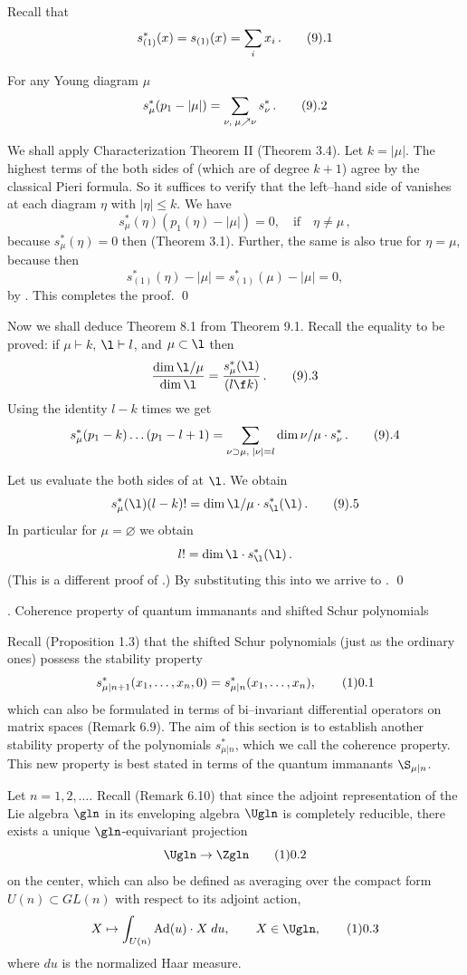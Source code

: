 Recall that 
$$
s^*_{(1)}(x)=s_{(1)}(x)=\sum_i x_i \,.\tag9.1
$$

 For any Young diagram $\mu$
$$
s^*_\mu (p_1-|\mu|) = \sum_{\nu,\;\mu\nearrow\nu} s^*_{\nu} \,. \tag9.2 
$$
\endproclaim

 We shall apply Characterization Theorem II (Theorem 3.4).
Let $k=|\mu|$. The highest terms of the both sides of  (which are 
of degree $k+1$) agree by the classical Pieri formula. So it suffices to
verify that the left--hand side of  vanishes at each diagram
$\eta$ with $|\eta|\le k$. We have
$$
s^*_\mu(\eta)(p_1(\eta)-|\mu|)=0,\quad\text{if}\quad 
\eta\ne\mu \,,
$$
because $s^*_\mu(\eta)=0$ then (Theorem 3.1). Further, the same is also
true for $\eta=\mu$, because then
$$
s^*_{(1)}(\eta)-|\mu|=s^*_{(1)}(\mu)-|\mu|=0,
$$
by . This completes the proof. \qed
\enddemo

Now we shall deduce Theorem 8.1 from Theorem 9.1. 
Recall the equality to be proved: if $\mu\vdash k$, $\l\vdash l$, and
$\mu\subset\l$ then
$$
\frac{\dim \l/\mu}{\dim \l} =
\frac{s^*_\mu(\l)}{(l\f k)} \,. \tag9.3
$$  
Using the identity  $l-k$ times we get
$$
s^*_\mu(p_1-k)\dots(p_1-l+1)=
\sum_{\nu\supset\mu,\;|\nu|=l} \dim\nu/\mu\cdot s^*_{\nu}\,. \tag9.4 
$$

Let us evaluate the both sides of  at $\l$. We obtain
$$
s^*_\mu(\l) (l-k)! = \dim\l/\mu\cdot s^*_{\l}(\l)\,. \tag9.5 
$$
In particular for $\mu=\varnothing$ we obtain
$$
l! = \dim\l\cdot s^*_{\l}(\l)\,.
$$
(This is a different proof of .) By substituting 
this into  we
arrive to . \qed
\enddemo


. Coherence property of quantum immanants and shifted Schur
polynomials \endhead

Recall (Proposition 1.3) that the shifted Schur polynomials (just as the
ordinary ones) possess the stability property
$$
s^*_{\mu|n+1}(x_1,\ldots,x_n,0)=s^*_{\mu|n}(x_1,\ldots,x_n),\tag10.1
$$
which can also be formulated in terms of bi--invariant differential
operators on matrix spaces (Remark 6.9). The aim of this section is
to establish another stability property of the polynomials $s^*_{\mu|n}$,
which we call the coherence property. This new property is best stated in
terms of the quantum immanants $\S_{\mu|n}$.

Let $n=1,2,\ldots$. Recall (Remark 6.10) that since the adjoint
representation of the Lie algebra 
$\gln$ in its enveloping algebra $\Ugln$ is completely reducible, there
exists a unique $\gln$-equivariant projection
$$
\Ugln\to\Zgln \tag10.2
$$
on the center, which can also be defined as averaging over the compact
form $U(n)\subset GL(n)$ with respect to its adjoint action,
$$
X\mapsto \int_{U(n)}\operatorname{Ad}(u)\cdot X\;du,
\qquad X\in\Ugln,\tag10.3
$$
where $du$ is the normalized Haar measure.


